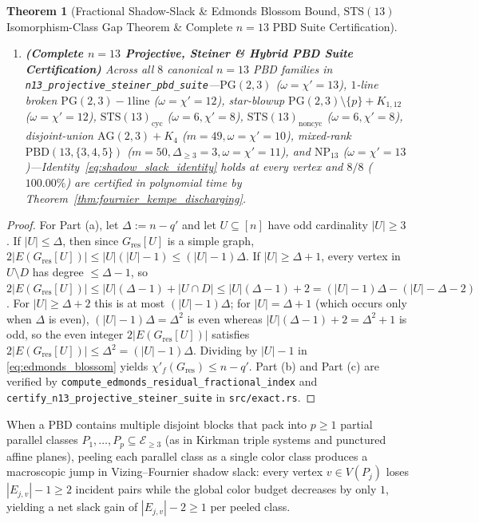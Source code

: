 \documentclass[11pt,reqno]{amsart}
\newtheorem{theorem}{Theorem}[section]
\theoremstyle{definition}
\theoremstyle{remark}
\begin{document}
\begin{theorem}[Fractional Shadow-Slack \& Edmonds Blossom Bound, $\mathrm{STS}(13)$ Isomorphism-Class Gap Theorem \& Complete $n = 13$ PBD Suite Certification]
\begin{enumerate}
  \item[\textup{(c)}] \textbf{(Complete $n = 13$ Projective, Steiner \& Hybrid PBD Suite Certification)} Across all $8$ canonical $n = 13$ PBD families in \texttt{n13\_projective\_steiner\_pbd\_suite}---$\mathrm{PG}(2,3)$ ($\omega = \chi' = 13$), $1$-line broken $\mathrm{PG}(2,3)-\text{1line}$ ($\omega = \chi' = 12$), star-blowup $\mathrm{PG}(2,3)\setminus\{p\}+K_{1,12}$ ($\omega = \chi' = 12$), $\mathrm{STS}(13)_{\mathrm{cyc}}$ ($\omega = 6, \chi' = 8$), $\mathrm{STS}(13)_{\mathrm{noncyc}}$ ($\omega = 6, \chi' = 8$), disjoint-union $\mathrm{AG}(2,3)+K_4$ ($m = 49, \omega = \chi' = 10$), mixed-rank $\mathrm{PBD}(13,\{3,4,5\})$ ($m = 50, \Delta_{\ge 3} = 3, \omega = \chi' = 11$), and $\mathrm{NP}_{13}$ ($\omega = \chi' = 13$)---Identity~\eqref{eq:shadow_slack_identity} holds at every vertex and $8 / 8$ ($100.00\%$) are certified in polynomial time by Theorem~\ref{thm:fournier_kempe_discharging}.
\end{enumerate}
\end{theorem}

\begin{proof}
For Part (a), let $\Delta := n - q'$ and let $U \subseteq [n]$ have odd cardinality $|U| \ge 3$. If $|U| \le \Delta$, then since $G_{\mathrm{res}}[U]$ is a simple graph, $2|E(G_{\mathrm{res}}[U])| \le |U|(|U| - 1) \le (|U| - 1)\Delta$. If $|U| \ge \Delta + 1$, every vertex in $U \setminus D$ has degree $\le \Delta - 1$, so $2|E(G_{\mathrm{res}}[U])| \le |U|(\Delta - 1) + |U \cap D| \le |U|(\Delta - 1) + 2 = (|U| - 1)\Delta - (|U| - \Delta - 2)$. For $|U| \ge \Delta + 2$ this is at most $(|U| - 1)\Delta$; for $|U| = \Delta + 1$ (which occurs only when $\Delta$ is even), $(|U| - 1)\Delta = \Delta^2$ is even whereas $|U|(\Delta - 1) + 2 = \Delta^2 + 1$ is odd, so the even integer $2|E(G_{\mathrm{res}}[U])|$ satisfies $2|E(G_{\mathrm{res}}[U])| \le \Delta^2 = (|U| - 1)\Delta$. Dividing by $|U| - 1$ in \eqref{eq:edmonds_blossom} yields $\chi'_f(G_{\mathrm{res}}) \le n - q'$. Part (b) and Part (c) are verified by \texttt{compute\_edmonds\_residual\_fractional\_index} and \texttt{certify\_n13\_projective\_steiner\_suite} in \texttt{src/exact.rs}.
\end{proof}

When a PBD contains multiple disjoint blocks that pack into $p \ge 1$ partial parallel classes $P_1, \dots, P_p \subseteq \mathcal{E}_{\ge 3}$ (as in Kirkman triple systems and punctured affine planes), peeling each parallel class as a single color class produces a macroscopic jump in Vizing--Fournier shadow slack: every vertex $v \in V(P_j)$ loses $|E_{j,v}| - 1 \ge 2$ incident pairs while the global color budget decreases by only $1$, yielding a net slack gain of $|E_{j,v}| - 2 \ge 1$ per peeled class.
\end{document}
